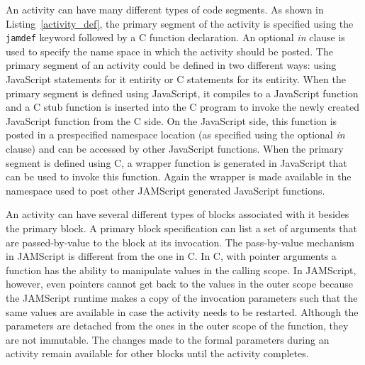 \documentclass[11pt]{article}
\begin{document}
An activity can have many different types of code segments. As shown in
Listing~\ref{activity_def}, the primary segment of the activity is specified
using the {\tt jamdef} keyword followed by a C function declaration. An optional
{\em in} clause is used to specify the name space in which the activity should
be posted. The primary segment of an activity could be defined in two different
ways: using JavaScript statements for it entirity or C statements for its
entirity. When the primary segment is defined using JavaScript, it compiles to a
JavaScript function and a C stub function is inserted into the C program to
invoke the newly created JavaScript function from the C side. On the JavaScript
side, this function is posted in a prespecified namespace location (as specified
using the optional {\em in} clause) and can be accessed by other JavaScript
functions. When the primary segment is defined using C, a wrapper function is
generated in JavaScript that can be used to invoke this function. Again the
wrapper is made available in the namespace used to post other JAMScript
generated JavaScript functions.


An activity can have several different types of blocks associated with it
besides the primary block. A primary block specification can list a set of
arguments that are passed-by-value to the block at its invocation. The
pass-by-value mechanism in JAMScript is different from the one in C. In C, with
pointer arguments a function has the ability to manipulate values in the calling
scope. In JAMScript, however, even pointers cannot get back to the values in the
outer scope because the JAMScript runtime makes a copy of the invocation
parameters such that the same values are available in case the activity needs to
be restarted. Although the parameters are detached from the ones in the outer
scope of the function, they are not immutable. The changes made to the formal
parameters during an activity remain available for other blocks until the
activity completes.
\end{document}
